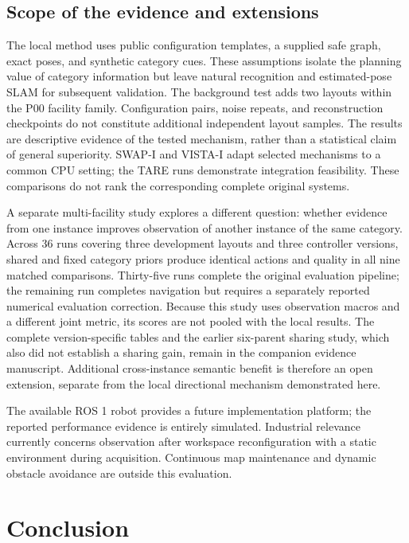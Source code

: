\documentclass[pdflatex,sn-mathphys-num]{sn-jnl}
\begin{document}
\hypertarget{scope-of-the-evidence-and-extensions}{%
\subsection{Scope of the evidence and extensions}\label{scope-of-the-evidence-and-extensions}}

The local method uses public configuration templates, a supplied safe graph, exact poses, and synthetic category cues. These assumptions isolate the planning value of category information but leave natural recognition and estimated-pose SLAM for subsequent validation. The background test adds two layouts within the P00 facility family. Configuration pairs, noise repeats, and reconstruction checkpoints do not constitute additional independent layout samples. The results are descriptive evidence of the tested mechanism, rather than a statistical claim of general superiority. SWAP-I and VISTA-I adapt selected mechanisms to a common CPU setting; the TARE runs demonstrate integration feasibility. These comparisons do not rank the corresponding complete original systems.

A separate multi-facility study explores a different question: whether evidence from one instance improves observation of another instance of the same category. Across 36 runs covering three development layouts and three controller versions, shared and fixed category priors produce identical actions and quality in all nine matched comparisons. Thirty-five runs complete the original evaluation pipeline; the remaining run completes navigation but requires a separately reported numerical evaluation correction. Because this study uses observation macros and a different joint metric, its scores are not pooled with the local results. The complete version-specific tables and the earlier six-parent sharing study, which also did not establish a sharing gain, remain in the companion evidence manuscript. Additional cross-instance semantic benefit is therefore an open extension, separate from the local directional mechanism demonstrated here.

The available ROS 1 robot provides a future implementation platform; the reported performance evidence is entirely simulated. Industrial relevance currently concerns observation after workspace reconfiguration with a static environment during acquisition. Continuous map maintenance and dynamic obstacle avoidance are outside this evaluation.

\hypertarget{conclusion}{%
\section{Conclusion}\label{conclusion}}
\end{document}

